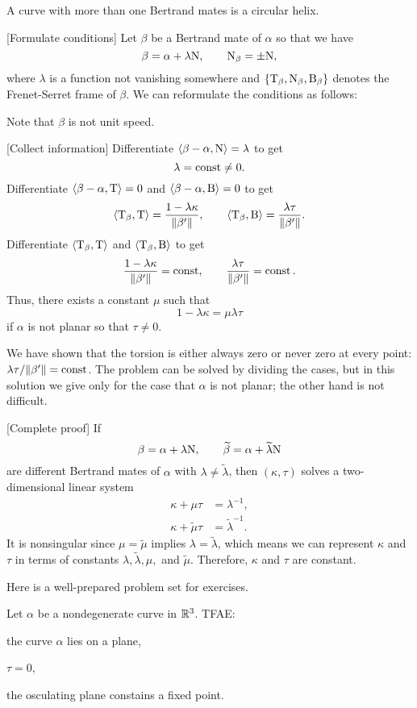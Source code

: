 \documentclass{../note}
\def\a{\alpha}
\begin{document}
\begin{prb}
A curve with more than one Bertrand mates is a circular helix.
\end{prb}
\begin{sol}
[Formulate conditions]
Let $\beta$ be a Bertrand mate of $\a$ so that we have
\[\beta=\a+\lambda\rN,\qquad\rN_\beta=\pm\rN,\]
where $\lambda$ is a function not vanishing somewhere and $\{\mathrm{T}_\beta,\mathrm{N}_\beta,\mathrm{B}_\beta\}$ denotes the Frenet-Serret frame of $\beta$.
We can reformulate the conditions as follows:

Note that $\beta$ is not unit speed.

[Collect information]
Differentiate $\<\beta-\a,\rN\>=\lambda$ to get
\[\lambda=\operatorname{const}\ne0.\]
Differentiate $\<\beta-\a,\rT\>=0$ and $\<\beta-\a,\rB\>=0$ to get
\[\langle\mathrm{T}_\beta,\mathrm{T}\rangle=\frac{1-\lambda\kappa}{\|\beta'\|},\qquad\langle\mathrm{T}_\beta,\mathrm{B}\rangle=\frac{\lambda\tau}{\|\beta'\|}.\]
Differentiate $\langle\mathrm{T}_\beta,\mathrm{T}\rangle$ and $\langle\mathrm{T}_\beta,\mathrm{B}\rangle$ to get
\[\frac{1-\lambda\kappa}{\|\beta'\|}=\operatorname{const},\qquad\frac{\lambda\tau}{\|\beta'\|}=\operatorname{const}.\]
Thus, there exists a constant $\mu$ such that
\[1-\lambda\kappa=\mu\lambda\tau\]
if $\a$ is not planar so that $\tau\ne0$.

We have shown that the torsion is either always zero or never zero at every point: $\lambda\tau/\|\beta'\|=\operatorname{const}$.
The problem can be solved by dividing the cases, but in this solution we give only for the case that $\a$ is not planar; the other hand is not difficult.

[Complete proof]
If
\[\beta=\a+\lambda\rN,\qquad\tilde\beta=\a+\tilde\lambda\rN\]
are different Bertrand mates of $\a$ with $\lambda\ne\tilde\lambda$, then $(\kappa,\tau)$ solves a two-dimensional linear system
\begin{align*}
\kappa+\mu\tau&=\lambda^{-1},\\
\kappa+\tilde\mu\tau&=\tilde\lambda^{-1}.
\end{align*}
It is nonsingular since $\mu=\tilde\mu$ implies $\lambda=\tilde\lambda$, which means we can represent $\kappa$ and $\tau$ in terms of constants $\lambda,\tilde\lambda,\mu,$ and $\tilde\mu$.
Therefore, $\kappa$ and $\tau$ are constant.
\end{sol}

Here is a well-prepared problem set for exercises.

\begin{prb}
Let $\a$ be a nondegenerate curve in $\mathbb{R}^3$.
TFAE:
\begin{parts}
\item the curve $\a$ lies on a plane,
\item $\tau=0$,
\item the osculating plane constains a fixed point.
\end{parts}
\end{prb}
\end{document}
